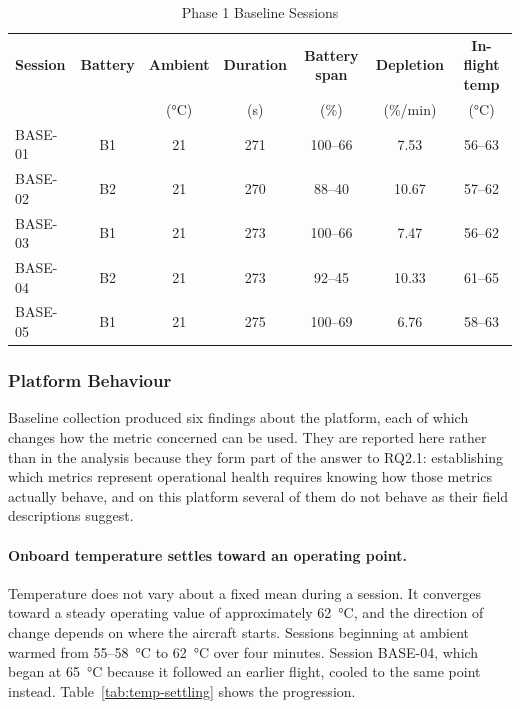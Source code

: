 \begin{table}[htbp]
\centering
\caption{Phase 1 Baseline Sessions}
\label{tab:baseline-sessions}
\small
\begin{tabular}{|l|c|c|c|c|c|c|}
\hline
\textbf{Session} & \textbf{Battery} & \textbf{Ambient} & \textbf{Duration} &
\textbf{Battery span} & \textbf{Depletion} & \textbf{In-flight temp} \\
 & & (\si{\celsius}) & (s) & (\%) & (\%/min) & (\si{\celsius}) \\
\hline
BASE-01 & B1 & 21 & 271 & 100--66 & 7.53 & 56--63 \\
BASE-02 & B2 & 21 & 270 & 88--40 & 10.67 & 57--62 \\
BASE-03 & B1 & 21 & 273 & 100--66 & 7.47 & 56--62 \\
BASE-04 & B2 & 21 & 273 & 92--45 & 10.33 & 61--65 \\
BASE-05 & B1 & 21 & 275 & 100--69 & 6.76 & 58--63 \\
\hline
\end{tabular}
\end{table}

\subsubsection{Platform Behaviour}\label{sec:rq2-platform}

Baseline collection produced six findings about the platform, each of which
changes how the metric concerned can be used. They are reported here rather than
in the analysis because they form part of the answer to RQ2.1: establishing
which metrics represent operational health requires knowing how those metrics
actually behave, and on this platform several of them do not behave as their
field descriptions suggest.

\paragraph{Onboard temperature settles toward an operating point.} Temperature
does not vary about a fixed mean during a session. It converges toward a steady
operating value of approximately \SI{62}{\celsius}, and the direction of change
depends on where the aircraft starts. Sessions beginning at ambient warmed from
\SI{55}{}--\SI{58}{\celsius} to \SI{62}{\celsius} over four minutes. Session
BASE-04, which began at \SI{65}{\celsius} because it followed an earlier flight,
cooled to the same point instead. Table~\ref{tab:temp-settling} shows the
progression.

